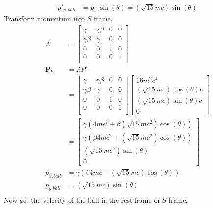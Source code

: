 \documentclass{article}
\begin{document}
\begin{itemize}
\begin{itemize}
\begin{align*}
            p'_{y,ball}&=p\cdot\sin(\theta)=\left(\sqrt{15}mc\right)\sin(\theta)
        \end{align*}
        Transform momentum into \(S\) frame.
        \begin{align*}
            \Lambda &=\begin{bmatrix}
                \gamma&\gamma\beta&0&0\\
                \gamma\beta&\gamma&0&0\\
                0&0&1&0\\
                0&0&0&1\\
            \end{bmatrix}\\
            \mathbf{P}c&=\Lambda P'\\
            &=\begin{bmatrix}
                \gamma&\gamma\beta&0&0\\
                \gamma\beta&\gamma&0&0\\
                0&0&1&0\\
                0&0&0&1\\
            \end{bmatrix}
            \begin{bmatrix}
                16m^2c^4\\
                \left(\sqrt{15}mc\right)\cos(\theta)c\\
                \left(\sqrt{15}mc\right)\sin(\theta)c\\
                0
            \end{bmatrix}\\
            &=\begin{bmatrix}
                \gamma\left(4mc^2+\beta\left(\sqrt{15}mc^2\right)\cos(\theta)\right)\\
                \gamma\left(\beta4mc^2+\left(\sqrt{15}mc^2\right)\cos(\theta)\right)\\
                \left(\sqrt{15}mc^2\right)\sin(\theta)\\
                0
            \end{bmatrix}\\
            p_{x,ball}&=\gamma\left(\beta4mc+\left(\sqrt{15}mc\right)\cos(\theta)\right)\\
            p_{y,ball}&=\left(\sqrt{15}mc\right)\sin(\theta)\\
        \end{align*}
        Now get the velocity of the ball in the rest frame or \(S\) frame.\\

\end{itemize}
\end{itemize}
\end{document}
